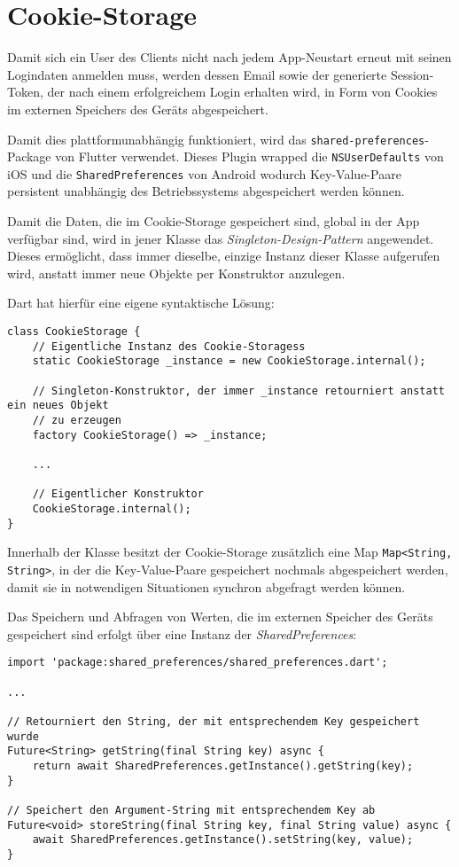 \section{Cookie-Storage}

Damit sich ein User des Clients nicht nach jedem App-Neustart erneut mit seinen Logindaten anmelden muss,
werden dessen Email sowie der generierte Session-Token, der nach einem erfolgreichem Login erhalten wird, 
in Form von Cookies im externen Speichers des Geräts abgespeichert.


Damit dies plattformunabhängig funktioniert, wird das \lstinline{shared-preferences}-Package von Flutter
verwendet.
Dieses Plugin wrapped die \lstinline{NSUserDefaults} von iOS und die \lstinline{SharedPreferences} von Android
wodurch Key-Value-Paare persistent unabhängig des Betriebssystems abgespeichert werden können.

Damit die Daten, die im Cookie-Storage gespeichert sind, global in der App verfügbar sind, wird in jener
Klasse das \textit{Singleton-Design-Pattern} angewendet. Dieses ermöglicht, dass immer dieselbe, einzige Instanz
dieser Klasse aufgerufen wird, anstatt immer neue Objekte per Konstruktor anzulegen.

Dart hat hierfür eine eigene syntaktische Lösung:

\begin{lstlisting}
class CookieStorage {
    // Eigentliche Instanz des Cookie-Storagess
    static CookieStorage _instance = new CookieStorage.internal();

    // Singleton-Konstruktor, der immer _instance retourniert anstatt ein neues Objekt
    // zu erzeugen
    factory CookieStorage() => _instance;

    ...

    // Eigentlicher Konstruktor
    CookieStorage.internal();
}
\end{lstlisting}

Innerhalb der Klasse besitzt der Cookie-Storage zusätzlich eine Map \lstinline{Map<String, String>}, in der die Key-Value-Paare
gespeichert nochmals abgespeichert werden, damit sie in notwendigen Situationen synchron abgefragt werden können.

Das Speichern und Abfragen von Werten, die im externen Speicher des Geräts gespeichert sind erfolgt über
eine Instanz der \textit{SharedPreferences}:

\begin{lstlisting}
import 'package:shared_preferences/shared_preferences.dart';

...

// Retourniert den String, der mit entsprechendem Key gespeichert wurde
Future<String> getString(final String key) async {
    return await SharedPreferences.getInstance().getString(key);
}

// Speichert den Argument-String mit entsprechendem Key ab
Future<void> storeString(final String key, final String value) async {
    await SharedPreferences.getInstance().setString(key, value);
}
\end{lstlisting}

